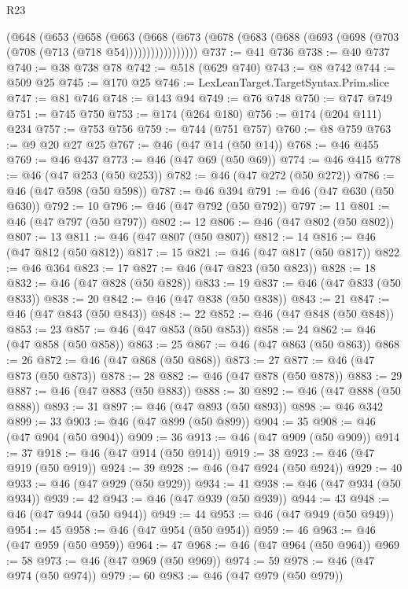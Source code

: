 \begin{lexlean}{R23}
\begin{coremodule}
{{{{{{{{{{{{{{{{{{{{{        (@648
          (@653
            (@658
              (@663
                (@668
                  (@673 (@678 (@683 (@688 (@693 (@698 (@703 (@708 (@713 (@718 @54)))))))))))))))))
@737 := @41 @736
@738 := @40 @737
@740 := @38 @738 @78
@742 := @518 (@629 @740)
@743 := @8 @742
@744 := @509 @25
@745 := @170 @25
@746 := LexLeanTarget.TargetSyntax.Prim.slice
@747 := @81 @746
@748 := @143 @94
@749 := @76 @748
@750 := @747 @749
@751 := @745 @750
@753 := @174 (@264 @180)
@756 := @174 (@204 @111) @234
@757 := @753 @756
@759 := @744 (@751 @757)
@760 := @8 @759
@763 := @9 @20 @27 @25
@767 := @46 (@47 @14 (@50 @14))
@768 := @46 @455
@769 := @46 @437
@773 := @46 (@47 @69 (@50 @69))
@774 := @46 @415
@778 := @46 (@47 @253 (@50 @253))
@782 := @46 (@47 @272 (@50 @272))
@786 := @46 (@47 @598 (@50 @598))
@787 := @46 @394
@791 := @46 (@47 @630 (@50 @630))
@792 := 10
@796 := @46 (@47 @792 (@50 @792))
@797 := 11
@801 := @46 (@47 @797 (@50 @797))
@802 := 12
@806 := @46 (@47 @802 (@50 @802))
@807 := 13
@811 := @46 (@47 @807 (@50 @807))
@812 := 14
@816 := @46 (@47 @812 (@50 @812))
@817 := 15
@821 := @46 (@47 @817 (@50 @817))
@822 := @46 @364
@823 := 17
@827 := @46 (@47 @823 (@50 @823))
@828 := 18
@832 := @46 (@47 @828 (@50 @828))
@833 := 19
@837 := @46 (@47 @833 (@50 @833))
@838 := 20
@842 := @46 (@47 @838 (@50 @838))
@843 := 21
@847 := @46 (@47 @843 (@50 @843))
@848 := 22
@852 := @46 (@47 @848 (@50 @848))
@853 := 23
@857 := @46 (@47 @853 (@50 @853))
@858 := 24
@862 := @46 (@47 @858 (@50 @858))
@863 := 25
@867 := @46 (@47 @863 (@50 @863))
@868 := 26
@872 := @46 (@47 @868 (@50 @868))
@873 := 27
@877 := @46 (@47 @873 (@50 @873))
@878 := 28
@882 := @46 (@47 @878 (@50 @878))
@883 := 29
@887 := @46 (@47 @883 (@50 @883))
@888 := 30
@892 := @46 (@47 @888 (@50 @888))
@893 := 31
@897 := @46 (@47 @893 (@50 @893))
@898 := @46 @342
@899 := 33
@903 := @46 (@47 @899 (@50 @899))
@904 := 35
@908 := @46 (@47 @904 (@50 @904))
@909 := 36
@913 := @46 (@47 @909 (@50 @909))
@914 := 37
@918 := @46 (@47 @914 (@50 @914))
@919 := 38
@923 := @46 (@47 @919 (@50 @919))
@924 := 39
@928 := @46 (@47 @924 (@50 @924))
@929 := 40
@933 := @46 (@47 @929 (@50 @929))
@934 := 41
@938 := @46 (@47 @934 (@50 @934))
@939 := 42
@943 := @46 (@47 @939 (@50 @939))
@944 := 43
@948 := @46 (@47 @944 (@50 @944))
@949 := 44
@953 := @46 (@47 @949 (@50 @949))
@954 := 45
@958 := @46 (@47 @954 (@50 @954))
@959 := 46
@963 := @46 (@47 @959 (@50 @959))
@964 := 47
@968 := @46 (@47 @964 (@50 @964))
@969 := 58
@973 := @46 (@47 @969 (@50 @969))
@974 := 59
@978 := @46 (@47 @974 (@50 @974))
@979 := 60
@983 := @46 (@47 @979 (@50 @979))
}}}}}}}}}}}}}}}}}}}}}
\end{coremodule}
\end{lexlean}
